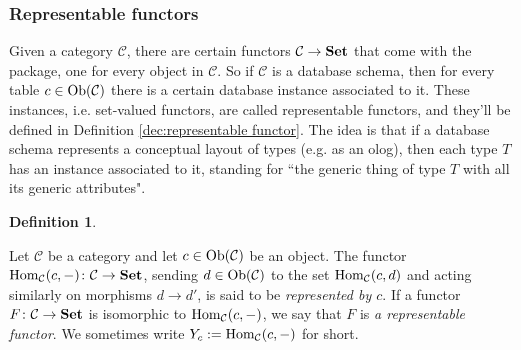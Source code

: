 \documentclass{book}
\def\tn{\textnormal}
\def\mc{\mathcal}
\def\Hom{\tn{Hom}}
\def\Ob{\tn{Ob}}
\def\to{\rightarrow}
\def\taking{\colon}
\def\Set{{\bf Set}}
\def\mcC{\mc{C}}
\theoremstyle{remark}
\theoremstyle{definition}
\newtheorem{definition}[subsubsection]{Definition}
\begin{document}

\subsubsection{Representable functors}\label{sec:representable functors}

Given a category $\mcC$, there are certain functors $\mcC\to\Set$ that come with the package, one for every object in $\mcC$. So if $\mcC$ is a database schema, then for every table $c\in\Ob(\mcC)$ there is a certain database instance associated to it. These instances, i.e. set-valued functors, are called representable functors, and they'll be defined in Definition \ref{dec:representable functor}. The idea is that if a database schema represents a conceptual layout of types (e.g. as an olog), then each type $T$ has an instance associated to it, standing for ``the generic thing of type $T$ with all its generic attributes".

\begin{definition}\label{def:representable functor}

Let $\mcC$ be a category and let $c\in\Ob(\mcC)$ be an object. The functor $\Hom_\mcC(c,-)\taking\mcC\to\Set$, sending $d\in\Ob(\mcC)$ to the set $\Hom_\mcC(c,d)$ and acting similarly on morphisms $d\to d'$, is said to be {\em represented by $c$}. If a functor $F\taking\mcC\to\Set$ is isomorphic to $\Hom_\mcC(c,-)$, we say that $F$ is {\em a representable functor}. We sometimes write $Y_c:=\Hom_\mcC(c,-)$ for short.

\end{definition}
\end{document}
